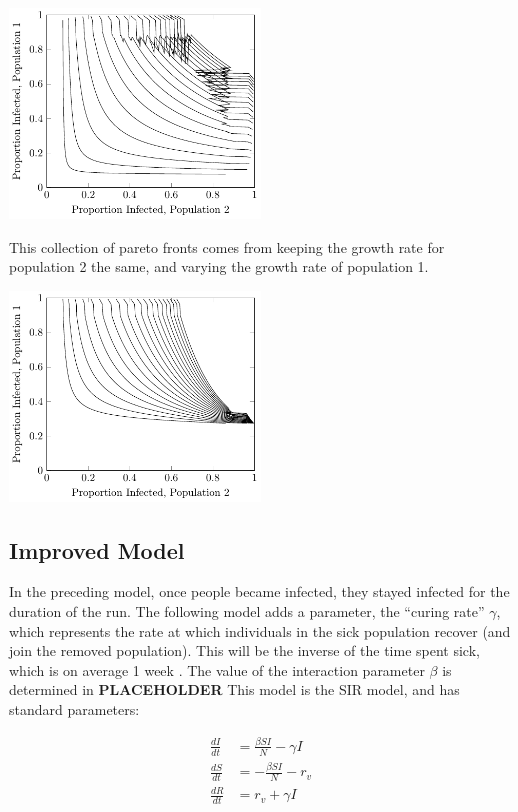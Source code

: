 \documentclass{article}
\begin{document}
\includegraphics[width=0.5\textwidth]{figures/vaccination-model-same-r-pareto-curves.pdf}

This collection of pareto fronts comes from keeping the growth
	rate for population 2 the same, and varying the growth
	rate of population 1.

\includegraphics[width=0.5\textwidth]{figures/vaccination-model-different-r-pareto-curves.pdf}

\subsection{Improved Model}

In the preceding model, once people became infected, they stayed
	infected for the duration of the run.
The following model adds a parameter, the ``curing rate'' $\gamma$,
	which represents the rate at which individuals in the sick population
	recover (and join the removed population).
This will be the inverse of the time spent sick, which is on average
	1 week \cite{CIC-stats}.
The value of the interaction parameter $\beta$ is determined in \textbf{PLACEHOLDER}
This model is the SIR model, and has standard parameters:

\begin{align*}
\frac{dI}{dt} & = \frac{ \beta S I}{N} - \gamma I\\
\frac{dS}{dt} & = -\frac{\beta S I}{N} - r_v \\
\frac{dR}{dt} & = r_v + \gamma I
\end{align*}
\end{document}
